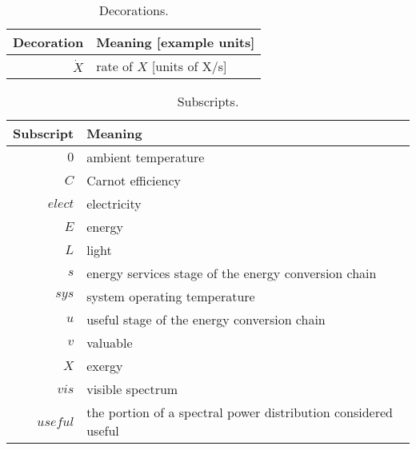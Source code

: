   
\begin{table}
\centering %
\caption{Decorations.}
\begin{tabular}{r l}
\toprule
Decoration & Meaning [example units] \\
\midrule
$\dot{X}$ & rate of $X$ [units of X/s] \\
\bottomrule
\end{tabular}
\label{tab:decorations}
\end{table}


  
\begin{table}
\centering
\caption{Subscripts.}
\begin{tabular}{r l}
\toprule
Subscript & Meaning \\
\midrule
$0$ & ambient temperature \\
$C$ & Carnot efficiency \\
$elect$ & electricity \\
$E$ & energy \\
$L$ & light \\
$s$ & energy services stage of the energy conversion chain \\
$sys$ & system operating temperature \\
$u$ & useful stage of the energy conversion chain \\
$v$ & valuable \\
$X$ & exergy \\
$vis$ & visible spectrum \\
$useful$ & the portion of a spectral power distribution considered useful \\
\bottomrule
\end{tabular}
\label{tab:subscripts}
\end{table}


